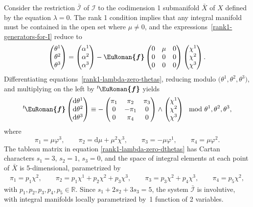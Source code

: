 \documentclass[pdftex]{sigma}
\numberwithin{equation}{section}
\newcommand{\eurom}{\EuRoman}
\renewcommand{\d}{\mathrm{d}}%
\newcommand{\cI}{{\mathcal I}}
\newcommand{\bbR}{{\mathbb R}}
\newcommand{\eurof}{\bm{\eurom{f}}}
\begin{document}
Consider the restriction $\bar{\cI}$ of $\cI$ to the codimension 1 submanifold $\bar{X}$ of $X$ defined by the equation $\lambda=0$.
The rank 1 condition implies that any integral manifold must be contained in the open set where $\mu \neq 0$, and the expressions~\eqref{rank1-generators-for-I} reduce to
\begin{gather}\label{rank1-lambda-zero-thetas}
\begin{pmatrix} \theta^1 \\ \theta^2 \\ \theta^3 \end{pmatrix} =
\begin{pmatrix} \alpha^1 \\ \alpha^2 \\ \alpha^3 \end{pmatrix} - \eurof
\begin{pmatrix} 0 & \mu & 0 \\ 0 & 0 & 0 \\ 0 & 0 & 0 \end{pmatrix}
\begin{pmatrix} \chi^1 \\ \chi^2 \\ \chi^3 \end{pmatrix}.
\end{gather}
Differentiating equations~\eqref{rank1-lambda-zero-thetas}, reducing modulo $\big(\theta^1, \theta^2, \theta^3\big)$, and multiplying on the left by ${}^t\hskip-1pt \eurof$ yields
\begin{gather}\label{rank1-lambda-zero-dthetas}
 {}^t\hskip-1pt \eurof \begin{pmatrix} \d\theta^1 \\ \d\theta^2 \\ \d\theta^3 \end{pmatrix} \equiv
- \begin{pmatrix} \pi_1 & \pi_2 & \pi_3 \\ 0 & -\pi_1 & 0 \\ 0 & \pi_4 & 0 \end{pmatrix} \wedge \begin{pmatrix} \chi^1 \\ \chi^2 \\ \chi^3 \end{pmatrix} \mod{\theta^1, \theta^2, \theta^3},
\end{gather}
where
\[
\pi_1 = \mu \varphi^3, \qquad \pi_2 = \d\mu + \mu^2 \chi^3, \qquad \pi_3 = -\mu \varphi^1, \qquad \pi_4 = \mu \varphi^2.
\]
The tableau matrix in equation \eqref{rank1-lambda-zero-dthetas} has Cartan characters $s_1 = 3$, $s_2 = 1$, $s_3=0$, and the space of integral elements at each point of $\bar{X}$ is 5-dimensional, parametrized by
\begin{gather*}
\pi_1 = p_1 \chi^2, \qquad
\pi_2 = p_1 \chi^1 + p_2 \chi^2 + p_3 \chi^3, \qquad
\pi_3 = p_3 \chi^2 + p_4 \chi^3, \qquad
\pi_4 = p_5 \chi^2,
\end{gather*}
with $p_1, p_2, p_3, p_4, p_5 \in \bbR$. Since $s_1 + 2 s_2 + 3 s_3 = 5$, the system $\bar{\cI}$ is involutive, with integral manifolds locally parametrized by~1 function of 2 variables.
\end{document}
